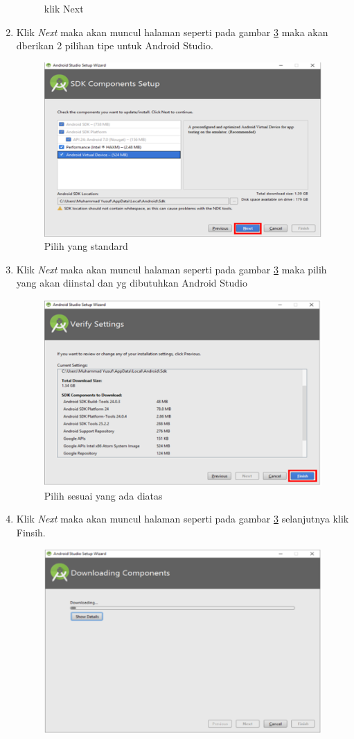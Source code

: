 \begin{enumerate}
\begin{figure}[!htbp]
  		 \caption{klik Next}\label{fig:done}
		 \end{figure}
		 \item Klik \textit{Next} maka akan muncul halaman seperti pada gambar \ref{fig:done} maka akan dberikan 2 pilihan tipe untuk Android Studio.
		 \begin{figure}[!htbp]
  		 \centering
 		 \includegraphics[width=.75\textwidth]{figures/In15.png}
  		 \caption{Pilih yang standard}\label{fig:done}
		 \end{figure}
		 \item Klik \textit{Next} maka akan muncul halaman seperti pada gambar \ref{fig:done} maka pilih yang akan diinstal dan yg dibutuhkan Android Studio
		 \begin{figure}[!htbp]
  		 \centering
 		 \includegraphics[width=.75\textwidth]{figures/In16.png}
  		 \caption{Pilih sesuai yang ada diatas}\label{fig:done}
		 \end{figure}
		 \item Klik \textit{Next} maka akan muncul halaman seperti pada gambar \ref{fig:done} selanjutnya klik Finsih.
		 \begin{figure}[!htbp]
  		 \centering
 		 \includegraphics[width=.75\textwidth]{figures/In17.png}

\end{figure}
\end{enumerate}

